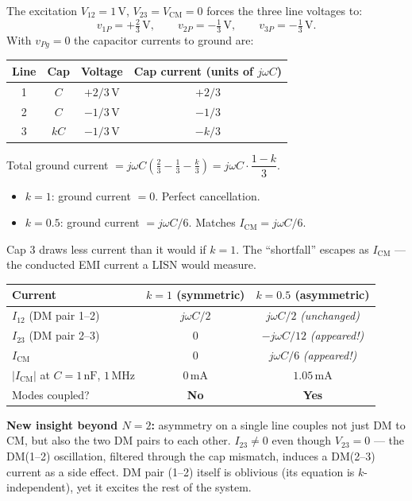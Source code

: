 \begin{physbox}[Physical Check: Why $I_{\mathrm{CM}} \neq 0$ for $k = 0.5$]
The excitation $V_{12} = 1\,\text{V}$, $V_{23} = V_{\mathrm{CM}} = 0$
forces the three line voltages to:
\[
    v_{1P} = +\tfrac{2}{3}\,\text{V},\qquad
    v_{2P} = -\tfrac{1}{3}\,\text{V},\qquad
    v_{3P} = -\tfrac{1}{3}\,\text{V}.
\]
With $v_{Pg} = 0$ the capacitor currents to ground are:
\begin{center}
\renewcommand{\arraystretch}{1.3}
\begin{tabular}{cccc}
\toprule
Line & Cap & Voltage & Cap current (units of $j\omega C$) \\
\midrule
1 & $C$   & $+2/3\,\text{V}$ & $+2/3$ \\
2 & $C$   & $-1/3\,\text{V}$ & $-1/3$ \\
3 & $kC$  & $-1/3\,\text{V}$ & $-k/3$ \\
\bottomrule
\end{tabular}
\end{center}
Total ground current $= j\omega C\!\left(\tfrac{2}{3} - \tfrac{1}{3}
- \tfrac{k}{3}\right) = j\omega C\cdot\dfrac{1-k}{3}$.
\begin{itemize}
    \item $k = 1$: ground current $= 0$.  Perfect cancellation. \checkmark
    \item $k = 0.5$: ground current $= j\omega C/6$.
          Matches $I_{\mathrm{CM}} = j\omega C/6$. \checkmark
\end{itemize}
Cap 3 draws less current than it would if $k = 1$.  The
``shortfall'' escapes as $I_{\mathrm{CM}}$ — the conducted EMI
current a LISN would measure.
\end{physbox}

\begin{statebox}[Summary: $k = 1$ vs.\ $k = 0.5$ for $N = 3$]
\begin{center}
\renewcommand{\arraystretch}{1.5}
\begin{tabular}{lcc}
\toprule
\textbf{Current}
    & $k = 1$ (symmetric)
    & $k = 0.5$ (asymmetric) \\
\midrule
$I_{12}$ (DM pair 1--2)
    & $j\omega C/2$
    & $j\omega C/2$ \emph{(unchanged)} \\
$I_{23}$ (DM pair 2--3)
    & $0$
    & $-j\omega C/12$ \emph{(appeared!)} \\
$I_{\mathrm{CM}}$
    & $0$
    & $j\omega C/6$ \emph{(appeared!)} \\
$|I_{\mathrm{CM}}|$ at $C=1\,\text{nF}$, $1\,\text{MHz}$
    & $0\,\text{mA}$
    & $1.05\,\text{mA}$ \\
Modes coupled?
    & \textbf{No}
    & \textbf{Yes} \\
\bottomrule
\end{tabular}
\end{center}
\textbf{New insight beyond $N = 2$:} asymmetry on a single line
couples not just DM to CM, but also the two DM pairs to each other.
$I_{23} \neq 0$ even though $V_{23} = 0$ — the DM(1--2) oscillation,
filtered through the cap mismatch, induces a DM(2--3) current as a
side effect.  DM pair (1--2) itself is oblivious (its equation is
$k$-independent), yet it excites the rest of the system.
\end{statebox}

